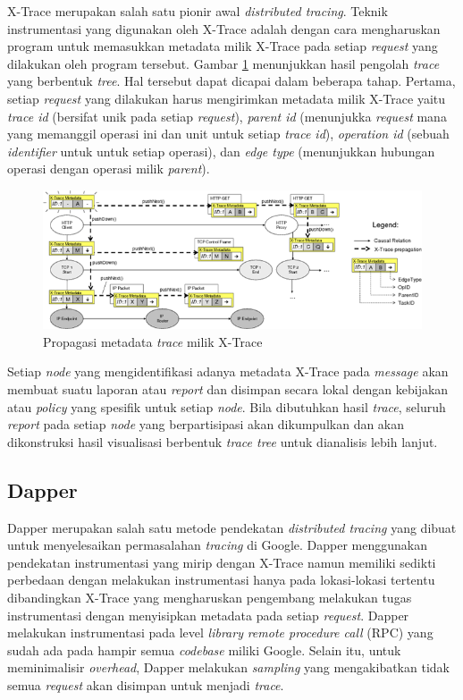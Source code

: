 X-Trace \citep{xtrace} merupakan salah satu pionir awal \textit{distributed tracing}. Teknik instrumentasi yang digunakan oleh X-Trace adalah dengan cara mengharuskan program untuk memasukkan metadata milik X-Trace pada setiap \textit{request} yang dilakukan oleh program tersebut. Gambar \ref{ch2-xtrace-1} menunjukkan hasil pengolah \textit{trace} yang berbentuk \textit{tree}. Hal tersebut dapat dicapai dalam beberapa tahap. Pertama, setiap \textit{request} yang dilakukan harus mengirimkan metadata milik X-Trace yaitu \textit{trace id} (bersifat unik pada setiap \textit{request}), \textit{parent id} (menunjukka \textit{request} mana yang memanggil operasi ini dan unit untuk setiap \textit{trace id}), \textit{operation id} (sebuah \textit{identifier} untuk untuk setiap operasi), dan \textit{edge type} (menunjukkan hubungan operasi dengan operasi milik \textit{parent}).
\begin{figure}[htb]
	\centering
	\includegraphics[width=1\textwidth]{resources/ch2/xtr-1.png}
	\caption{Propagasi metadata \textit{trace} milik X-Trace \citep{xtrace}}
	\label{ch2-xtrace-1}
\end{figure}

Setiap \textit{node} yang mengidentifikasi adanya metadata X-Trace pada \textit{message} akan membuat suatu laporan atau \textit{report} dan disimpan secara lokal dengan kebijakan atau \textit{policy} yang spesifik untuk setiap \textit{node}. Bila dibutuhkan hasil \textit{trace}, seluruh \textit{report} pada setiap \textit{node} yang berpartisipasi akan dikumpulkan dan akan dikonstruksi hasil visualisasi berbentuk \textit{trace tree} untuk dianalisis lebih lanjut.

\subsection{Dapper}

Dapper \citep{dapper-paper} merupakan salah satu metode pendekatan \textit{distributed tracing} yang dibuat untuk menyelesaikan permasalahan \textit{tracing} di Google. Dapper menggunakan pendekatan instrumentasi yang mirip dengan X-Trace namun memiliki sedikti perbedaan dengan melakukan instrumentasi hanya pada lokasi-lokasi tertentu dibandingkan X-Trace yang mengharuskan pengembang melakukan tugas instrumentasi dengan menyisipkan metadata pada setiap \textit{request}. Dapper melakukan instrumentasi pada level \textit{library} \textit{remote procedure call} (RPC) yang sudah ada pada hampir semua \textit{codebase} miliki Google. Selain itu, untuk meminimalisir \textit{overhead}, Dapper melakukan \textit{sampling} yang mengakibatkan tidak semua \textit{request} akan disimpan untuk menjadi \textit{trace}. 

